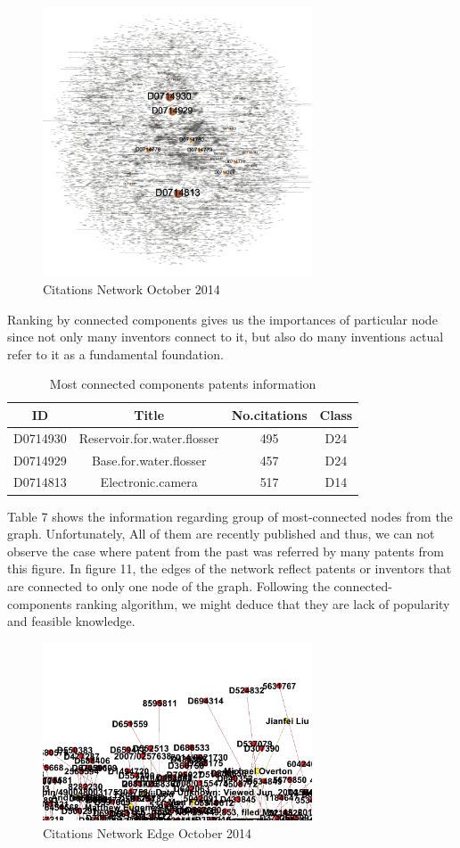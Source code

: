 \documentclass{sig-alternate}
\begin{document}
{\begin{figure}[htp]
\centering
\includegraphics[width=80mm]{citation-label.png}
\caption{ Citations Network October 2014 }
\end{figure}
Ranking by connected components gives us the importances of particular node since not only many inventors connect to it, but also do many inventions actual refer to it as a fundamental foundation.  
\begin{table}[ht]
\begin{tabular}{|c|c|c|c|}  \hline
 ID&Title&No.citations&Class\\ \hline
 D0714930&Reservoir.for.water.flosser&495&D24\\ \hline
D0714929&Base.for.water.flosser&457 &D24\\ \hline
D0714813&Electronic.camera&517&D14 \\ \hline
\end{tabular}
\caption{Most connected components patents information}
\end{table}
Table 7 shows the information regarding group of most-connected nodes from the graph. Unfortunately, All of them are recently published and thus, we can not observe the case where patent from the past was referred by many patents from this figure.
In figure 11, the edges of the network reflect patents or inventors that are connected to only one node of the graph. Following the connected-components ranking algorithm, we might deduce that they are lack of popularity and feasible knowledge.
 \begin{figure}[!htb]
\centering
\includegraphics[width=80mm]{endcitation.png}
\caption{ Citations Network Edge October 2014 }
\end{figure}



}
\end{document}

